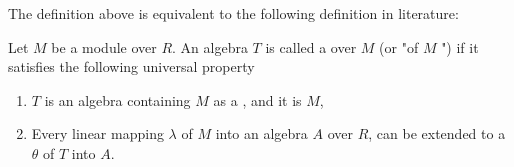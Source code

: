\begin{remark}
    \label{mk:TensorAlgebra}

    The definition above is equivalent to the following definition in literature:

    Let $M$ be a module over $R$. An algebra $T$ is called a  over $M$ (or "of $M$ ")
    if it satisfies the following universal property

    \begin{enumerate}
    \item $T$ is an algebra containing $M$ as a , and it is  $M$,
    \item Every linear mapping $\lambda$ of $M$ into an algebra $A$ over $R$, can be extended to 
    a  $\theta$ of $T$ into $A$.
    \end{enumerate}
    
\end{remark}